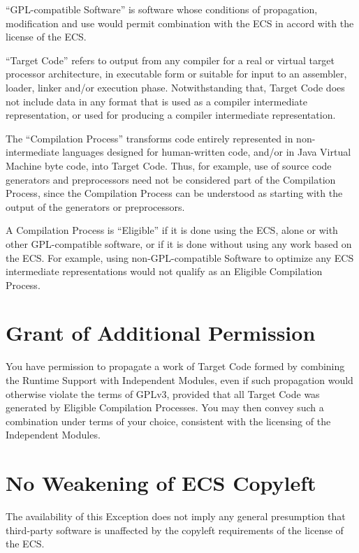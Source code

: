 ``GPL-compatible Software'' is software whose conditions of propagation,
modification and use would permit combination with the ECS in accord
with the license of the ECS.

``Target Code'' refers to output from any compiler for a real or virtual
target processor architecture, in executable form or suitable for
input to an assembler, loader, linker and/or execution
phase. Notwithstanding that, Target Code does not include data in any
format that is used as a compiler intermediate representation, or used
for producing a compiler intermediate representation.

The ``Compilation Process'' transforms code entirely represented in
non-intermediate languages designed for human-written code, and/or in
Java Virtual Machine byte code, into Target Code. Thus, for example,
use of source code generators and preprocessors need not be considered
part of the Compilation Process, since the Compilation Process can be
understood as starting with the output of the generators or
preprocessors.

A Compilation Process is ``Eligible'' if it is done using the ECS, alone
or with other GPL-compatible software, or if it is done without using
any work based on the ECS. For example, using non-GPL-compatible
Software to optimize any ECS intermediate representations would not
qualify as an Eligible Compilation Process.

\section{Grant of Additional Permission}

You have permission to propagate a work of Target Code formed by
combining the Runtime Support with Independent Modules, even if such
propagation would otherwise violate the terms of GPLv3, provided that
all Target Code was generated by Eligible Compilation Processes. You
may then convey such a combination under terms of your choice,
consistent with the licensing of the Independent Modules.

\section{No Weakening of ECS Copyleft}

The availability of this Exception does not imply any general
presumption that third-party software is unaffected by the copyleft
requirements of the license of the ECS.

\concludechapter
